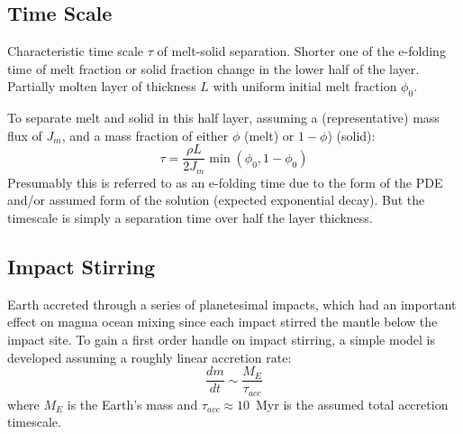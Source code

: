 \subsection{Time Scale}
Characteristic time scale $\tau$ of melt-solid separation.  Shorter one of the e-folding time of melt fraction or solid fraction change in the lower half of the layer.  Partially molten layer of thickness $L$ with uniform initial melt fraction $\phi_0$.

To separate melt and solid in this half layer, assuming a (representative) mass flux of $J_m$, and a mass fraction of either $\phi$ (melt) or $1-\phi$) (solid):
\begin{equation}
\tau = \frac{\rho L}{2 J_m} \min (\phi_0, 1-\phi_0 )
\end{equation}
Presumably this is referred to as an e-folding time due to the form of the PDE and/or assumed form of the solution (expected exponential decay).  But the timescale is simply a separation time over half the layer thickness.

\subsection{Impact Stirring}

Earth accreted through a series of planetesimal impacts, which had an important effect on magma ocean mixing since each impact stirred the mantle below the impact site.
To gain a first order handle on impact stirring, a simple model is developed assuming a roughly linear accretion rate:
\begin{equation}
\frac{dm}{dt} \sim \frac{M_E}{\tau_{acc}}
\label{eq:abe1993_accrate}
\end{equation}
where $M_E$ is the Earth's mass and $\tau_{acc} \approx 10$~Myr is the assumed total accretion timescale.

